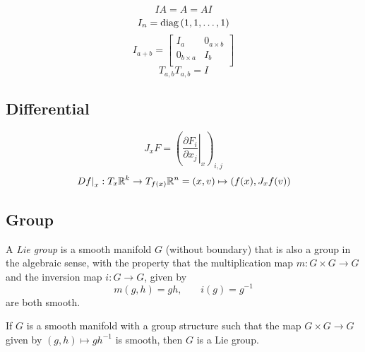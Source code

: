\documentclass[../main.tex]{subfiles}
\begin{document}
\begin{equation}\label{Matrix:Identity}
    IA = A = AI
\end{equation}
\begin{equation}\label{Matrix:Identity:Value}
    I_n=\operatorname{diag}{\left(1,1,\dots,1\right)}
\end{equation}
\begin{equation}\label{Matrix:Identity:Block}
    I_{a+b}=
    \begin{bmatrix}
        I_a           & 0_{a\times b} \\
        0_{b\times a} & I_b           \\
    \end{bmatrix}
\end{equation}
\begin{equation}\label{Matrix:Permutation:Square}
    T_{a,b} T_{a,b}= I
\end{equation}

\subsection{Differential}
\begin{equation}
    J_xF = \left(\left.\frac{\partial F_i}{\partial x_j}\right|_x\right)_{i,j}
\end{equation}
\begin{equation}
    \left.Df\right|_x
    : T_x\mathbb{R}^k\to T_{f(x)}\mathbb{R}^n
    = \left(x,v\right) \mapsto \left(f(x),J_xf(v)\right)
\end{equation}

\subsection{Group}

\begin{definition}\label{Group:Lie}
    A \textit{Lie group} is a smooth manifold $G$ (without boundary)
    that is also a group in the algebraic sense,
    with the property that
    the multiplication map $m:G\times G\to G$
    and the inversion map $i:G\to G$, given by
    \begin{equation*}
        m\left(g,h\right)=gh\text{,}
        \quad\quad
        i\left(g\right)=g^{-1}
    \end{equation*}
    are both smooth.
\end{definition}

\begin{proposition}\label{Group:Lie:Assertion}
    If $G$ is a smooth manifold with a group structure such that the map $G\times G\to G$ given by $\left(g,h\right)\mapsto gh^{-1}$ is smooth, then $G$ is a Lie group.
\end{proposition}
\end{document}
